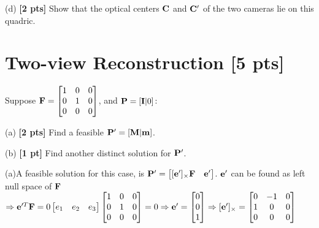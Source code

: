 \documentclass[11pt,addpoints,answers]{exam}
\numberwithin{equation}{section} %
\numberwithin{figure}{section} %
\numberwithin{table}{section} %
\begin{document}
\begin{questions}
(d) \textbf{[2 pts]} Show that the optical centers $\mathbf{C}$ and $\mathbf{C}^\prime$ of the two cameras lie on this quadric.

\begin{tcolorbox}[fit,height=12cm, width=\linewidth, blank, borderline={0.5pt}{-2pt},halign=center, nobeforeafter]
\end{tcolorbox}

\section{Two-view Reconstruction [5 pts]}

\question  Suppose $\mathbf{F} = \begin{bmatrix}
    1 & 0 & 0\\
    0 & 1 & 0\\
    0 & 0 & 0
\end{bmatrix}$, and $\mathbf{P} =[\mathbf{I} | 0 ]$:

(a) \textbf{[2 pts]} Find a feasible $\mathbf{P}' = [\mathbf{M} | \mathbf{m}]$.

(b) \textbf{[1 pt]} Find another distinct solution for $\mathbf{P}'$.

\begin{tcolorbox}[fit,height=6cm, width=\textwidth, blank, borderline={0.5pt}{-2pt},halign=left, valign=center, nobeforeafter]

(a)A feasible solution for this case, is $\mathbf{P}' = \begin{bmatrix} [\mathbf{e}']_{\times}\mathbf{F} & \mathbf{e}' \end{bmatrix}$. $\mathbf{e}'$ can be found as left null space of $\mathbf{F}$\\

$\Rightarrow \mathbf{e}'^T \mathbf{F} =0 \begin{bmatrix} e_1&e_2&e_3\end{bmatrix} \begin{bmatrix}
    1 & 0 & 0\\
    0 & 1 & 0\\
    0 & 0 & 0
\end{bmatrix} = 0 \Rightarrow \mathbf{e}' = \begin{bmatrix} 0\\0\\1\end{bmatrix} \Rightarrow [\mathbf{e}']_{\times} = \begin{bmatrix}
    0 & -1 & 0\\
    1 & 0 & 0\\
    0 & 0 & 0
\end{bmatrix} $\\


\end{tcolorbox}
\end{questions}
\end{document}
